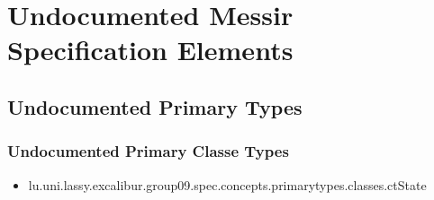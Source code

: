 	
\chapter{Undocumented Messir Specification Elements}











\section[Undocumented Primary Types]{Undocumented Primary Types}

\subsection[Undocumented Primary Classe Types]{Undocumented Primary Classe Types}
\begin{itemize}
\item lu.uni.lassy.excalibur.group09.spec.concepts.primarytypes.classes.ctState 
\end{itemize}

























